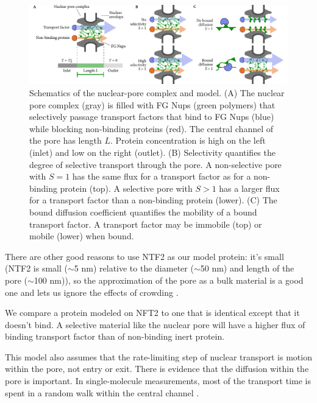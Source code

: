 \begin{figure}[t!]
\centering
\includegraphics[width=17.8cm]{figs/ch02/fig1.pdf}
\caption{Schematics of the nuclear-pore complex and model. (A) The
  nuclear pore complex (gray) is filled with FG Nups (green polymers)
  that selectively passage transport factors that bind to FG Nups
  (blue) while blocking non-binding proteins (red). The central
  channel of the pore has length $L$. Protein concentration is high on
  the left (inlet) and low on the right (outlet).  (B) Selectivity
  quantifies the degree of selective transport through the pore. A
  non-selective pore with $S=1$ has the same flux for a transport
  factor as for a non-binding protein (top). A selective pore with
  $S>1$ has a larger flux for a transport factor than a non-binding
  protein (lower). (C) The bound diffusion coefficient quantifies the
  mobility of a bound transport factor.  A transport factor may be
  immobile (top) or mobile (lower) when bound. }
\label{fig:cartoon}
\end{figure}

There are other good reasons to use NTF2 as our model protein: it's small (NTF2 is small ($\sim$5 nm) relative
to the diameter ($\sim$50 nm) and length of the pore ($\sim$100 nm)), so the approximation of the pore as a bulk material is a good one and lets us ignore the effects of crowding \cite{zilman07}.

We compare a protein modeled on NFT2 to one that is identical except that it doesn't bind.  A selective material like the nuclear pore will have a higher flux of binding transport factor than of non-binding inert protein.

This model also assumes that the rate-limiting step of nuclear transport is motion within the pore, not entry or exit.  There is evidence that the diffusion within the pore is important. In single-molecule measurements, most of the transport time is spent in a random walk within the central channel \cite{yang04, tu13}.

